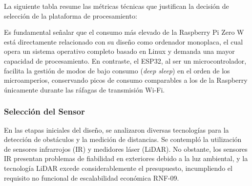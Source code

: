La siguiente tabla resume las métricas técnicas que justifican la decisión de selección de la plataforma de procesamiento:

\begin{table}[H]
\centering
{}
\caption{Comparativa técnica de plataformas de control.}
\label{tab:comparativa_plataformas}
\end{table}

Es fundamental señalar que el consumo más elevado de la Raspberry Pi Zero W está directamente relacionado con su diseño como ordenador monoplaca, el cual opera un sistema operativo completo basado en Linux y demanda una mayor capacidad de procesamiento. En contraste, el ESP32, al ser un microcontrolador, facilita la gestión de modos de bajo consumo (\textit{deep sleep}) en el orden de los microamperios, conservando picos de consumo comparables a los de la Raspberry únicamente durante las ráfagas de transmisión Wi-Fi.

\subsubsection*{Selección del Sensor}

En las etapas iniciales del diseño, se analizaron diversas tecnologías para la detección de obstáculos y la medición de distancias. Se contempló la utilización de sensores infrarrojos (IR) y medidores láser (LiDAR). No obstante, los sensores IR presentan problemas de fiabilidad en exteriores debido a la luz ambiental, y la tecnología LiDAR excede considerablemente el presupuesto, incumpliendo el requisito no funcional de escalabilidad económica RNF-09.

